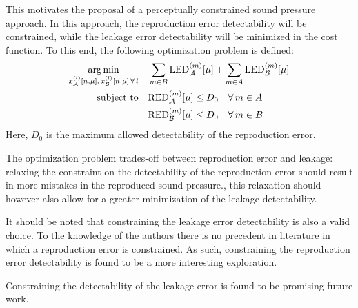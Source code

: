 This motivates the proposal of a perceptually constrained sound pressure approach.
In this approach, the reproduction error detectability will be constrained, while the leakage error detectability will be minimized in the cost function.
To this end, the following optimization problem is defined:
\begin{equation}
    \begin{aligned}
    \operatorname*{arg\,min}_{\tilde{x}_{\mathcal{A}}^{(l)}[n,\mu],\,\tilde{x}_{\mathcal{B}}^{(l)}[n,\mu]\,\forall\,l}\quad 
       & \sum_{m\in B}\text{LED}_{\mathcal{A}}^{(m)}[\mu] + \sum_{m\in A}\text{LED}_{\mathcal{B}}^{(m)}[\mu]\\
        \operatorname*{subject\,\,to}\quad & \text{RED}_{\mathcal{A}}^{(m)}[\mu] \leq D_0 \quad\forall\, m\in A\\
                    & \text{RED}_{\mathcal{B}}^{(m)}[\mu] \leq D_0 \quad\forall\, m\in B
    \end{aligned}
\end{equation}
Here, $D_0$ is the maximum allowed detectability of the reproduction error.

The optimization problem trades-off between reproduction error and leakage: 
relaxing the constraint on the detectability of the reproduction error should result in more mistakes in the reproduced sound pressure.,
this relaxation should however also allow for a greater minimization of the leakage detectability.

It should be noted that constraining the leakage error detectability is also a valid choice.
To the knowledge of the authors there is no precedent in literature in which a reproduction error is constrained.
As such, constraining the reproduction error detectability is found to be a more interesting exploration.

Constraining the detectability of the leakage error is found to be promising future work.
